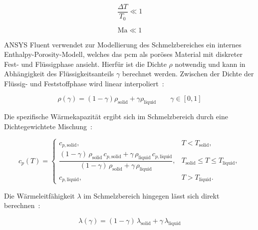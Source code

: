 \noindent\begin{minipage}{.5\linewidth}
  \begin{equation}
    \label{eq:bossinesque_bedingung1}
    \frac{\Delta T}{T_0} \ll 1
  \end{equation}
\end{minipage}%
\begin{minipage}{.5\linewidth}
  \begin{equation}
    \label{eq:bossinesque_bedingung2}
    \text{Ma} \ll 1
  \end{equation}
\end{minipage}

ANSYS Fluent verwendet zur Modellierung des Schmelzbereiches ein internes Enthalpy-Porosity-Modell, welches das \ac{pcm} als poröses Material
mit diskreter Fest- und Flüssigphase ansieht. Hierfür ist die Dichte $\rho$ notwendig und kann in Abhängigkeit des Flüssigkeitsanteils $\gamma$ berechnet werden.
Zwischen der Dichte der Flüssig- und Feststoffphase wird linear interpoliert~\cite{akamcae-udf}:

\begin{equation}
  \label{eq:udf_dichte}
  \rho(\gamma) = \left(1- \gamma\right) \rho_\text{solid} + \gamma \rho_\text{liquid} \qquad \gamma \in [0,1]
\end{equation}

Die spezifische Wärmekapazität ergibt sich im Schmelzbereich durch eine Dichtegewichtete Mischung~\cite{akamcae-udf}:

\begin{equation}
  \label{eq:udf_cp}
    c_p(T)=
  \begin{cases}
    c_{p,\mathrm{solid}}, & T < T_\mathrm{solid},\\[6pt]
    \dfrac{(1-\gamma)\,\rho_\mathrm{solid}\,c_{p,\mathrm{solid}} + \gamma\,\rho_\mathrm{liquid}\,c_{p,\mathrm{liquid}}}
          {(1-\gamma)\,\rho_\mathrm{solid} + \gamma\,\rho_\mathrm{liquid}}, & T_\mathrm{solid} \le T \le T_\mathrm{liquid},\\[12pt]
    c_{p,\mathrm{liquid}}, & T > T_\mathrm{liquid}.
  \end{cases}
\end{equation}

Die Wärmeleitfähigkeit $\lambda$ im Schmelzbereich hingegen lässt sich direkt berechnen~\cite{akamcae-udf}:

\begin{equation}
  \label{eq:udf_lambda}
  \lambda(\gamma)= (1-\gamma)\,\lambda_{\mathrm{solid}} + \gamma\,\lambda_{\mathrm{liquid}}
\end{equation}

